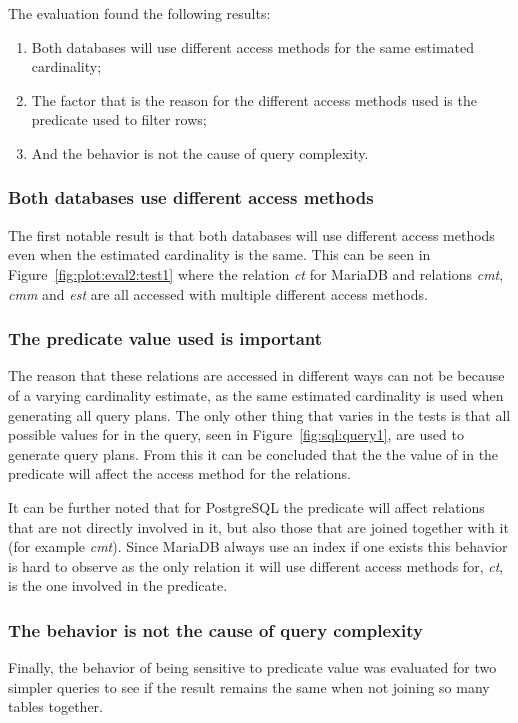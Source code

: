 The evaluation found the following results:
\begin{enumerate}
\item Both databases will use different access methods for the same estimated
  cardinality;
\item The factor that is the reason for the different access methods used is the
  predicate used to filter rows;
\item And the behavior is not the cause of query complexity.
\end{enumerate}

\subsubsection{Both databases use different access methods}
The first notable result is that both databases will use different access
methods even when the estimated cardinality is the same. This can be
seen in Figure~\ref{fig:plot:eval2:test1} where the relation \textit{ct} for
MariaDB and relations \textit{cmt}, \textit{cmm} and \textit{est} are all
accessed with multiple different access methods.

\subsubsection{The predicate value used is important}
The reason that these relations are accessed in different ways can not be
because of a varying cardinality estimate, as the same estimated cardinality is
used when generating all query plans. The only other thing that varies in the
tests is that all possible values for  in the query, seen in
Figure~\ref{fig:sql:query1}, are used to generate query plans. From this it can
be concluded that the the value of  in the predicate  will affect the access method for the relations.

It can be further noted that for PostgreSQL the predicate will affect relations
that are not directly involved in it, but also those that are joined together
with it (for example \textit{cmt}). Since MariaDB always use an index if one
exists this behavior is hard to observe as the only relation it will use
different access methods for, \textit{ct}, is the one involved in the predicate.

\subsubsection{The behavior is not the cause of query complexity}
Finally, the behavior of being sensitive to predicate value was evaluated for
two simpler queries to see if the result remains the same when not
joining so many tables together.

